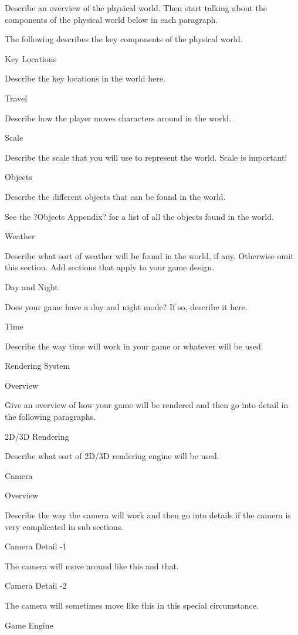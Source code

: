 \documentclass[a4paper]{article}
\begin{document}
	Describe an overview of the physical world.  Then start talking about the components of the physical world below in each paragraph.

The following describes the key components of the physical world.

Key Locations

	Describe the key locations in the world here.

Travel

	Describe how the player moves characters around in the world.

Scale

	Describe the scale that you will use to represent the world.  Scale is important!	

Objects

	Describe the different objects that can be found in the world.

See the ?Objects Appendix? for a list of all the objects found in the world.

Weather

	Describe what sort of weather will be found in the world, if any.  Otherwise omit this section.  Add sections that apply to your game design.

Day and Night

	Does your game have a day and night mode?  If so, describe it here.

Time

	Describe the way time will work in your game or whatever will be used.

Rendering System

Overview

	Give an overview of how your game will be rendered and then go into detail in the following paragraphs.

2D/3D Rendering

	Describe what sort of 2D/3D rendering engine will be used.

Camera

Overview

Describe the way the camera will work and then go into details if the camera is very complicated in sub sections.

Camera Detail -1

	The camera will move around like this and that.

Camera Detail -2

	The camera will sometimes move like this in this special circumstance.

Game Engine
\end{document}

